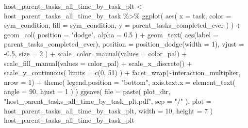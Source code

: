 \documentclass[
]{book}
\newenvironment{Shaded}{\begin{snugshade}}{\end{snugshade}}
\newcommand{\AttributeTok}[1]{\textcolor[rgb]{0.77,0.63,0.00}{#1}}
\newcommand{\DecValTok}[1]{\textcolor[rgb]{0.00,0.00,0.81}{#1}}
\newcommand{\FloatTok}[1]{\textcolor[rgb]{0.00,0.00,0.81}{#1}}
\newcommand{\FunctionTok}[1]{\textcolor[rgb]{0.00,0.00,0.00}{#1}}
\newcommand{\NormalTok}[1]{#1}
\newcommand{\OtherTok}[1]{\textcolor[rgb]{0.56,0.35,0.01}{#1}}
\newcommand{\SpecialCharTok}[1]{\textcolor[rgb]{0.00,0.00,0.00}{#1}}
\newcommand{\StringTok}[1]{\textcolor[rgb]{0.31,0.60,0.02}{#1}}
\begin{document}
\begin{Shaded}
\begin{Highlighting}[]
\NormalTok{host\_parent\_tasks\_all\_time\_by\_task\_plt }\OtherTok{\textless{}{-}}\NormalTok{ host\_parent\_tasks\_all\_time\_by\_task }\SpecialCharTok{\%\textgreater{}\%}
  \FunctionTok{ggplot}\NormalTok{(}
    \FunctionTok{aes}\NormalTok{(}
      \AttributeTok{x =}\NormalTok{ task,}
      \AttributeTok{color =}\NormalTok{ sym\_condition,}
      \AttributeTok{fill =}\NormalTok{ sym\_condition,}
      \AttributeTok{y =}\NormalTok{ parent\_tasks\_completed\_ever}
\NormalTok{    )}
\NormalTok{  ) }\SpecialCharTok{+}
  \FunctionTok{geom\_col}\NormalTok{(}
    \AttributeTok{position =} \StringTok{"dodge"}\NormalTok{,}
    \AttributeTok{alpha =} \FloatTok{0.5}
\NormalTok{  ) }\SpecialCharTok{+}
  \FunctionTok{geom\_text}\NormalTok{(}
    \FunctionTok{aes}\NormalTok{(}\AttributeTok{label =}\NormalTok{ parent\_tasks\_completed\_ever),}
    \AttributeTok{position =} \FunctionTok{position\_dodge}\NormalTok{(}\AttributeTok{width =} \DecValTok{1}\NormalTok{),}
    \AttributeTok{vjust =} \SpecialCharTok{{-}}\FloatTok{0.5}\NormalTok{,}
    \AttributeTok{size =} \DecValTok{2}
\NormalTok{  ) }\SpecialCharTok{+}
  \FunctionTok{scale\_color\_manual}\NormalTok{(}\AttributeTok{values =}\NormalTok{ color\_pal) }\SpecialCharTok{+}
  \FunctionTok{scale\_fill\_manual}\NormalTok{(}\AttributeTok{values =}\NormalTok{ color\_pal) }\SpecialCharTok{+}
  \FunctionTok{scale\_x\_discrete}\NormalTok{() }\SpecialCharTok{+}
  \FunctionTok{scale\_y\_continuous}\NormalTok{(}
    \AttributeTok{limits =} \FunctionTok{c}\NormalTok{(}\DecValTok{0}\NormalTok{, }\DecValTok{51}\NormalTok{)}
\NormalTok{  ) }\SpecialCharTok{+}
  \FunctionTok{facet\_wrap}\NormalTok{(}\SpecialCharTok{\textasciitilde{}}\NormalTok{interaction\_multiplier, }\AttributeTok{nrow =} \DecValTok{1}\NormalTok{) }\SpecialCharTok{+}
  \FunctionTok{theme}\NormalTok{(}
    \AttributeTok{legend.position =} \StringTok{"bottom"}\NormalTok{,}
    \AttributeTok{axis.text.x =} \FunctionTok{element\_text}\NormalTok{(}
      \AttributeTok{angle =} \DecValTok{90}\NormalTok{,}
      \AttributeTok{hjust =} \DecValTok{1}
\NormalTok{    )}
\NormalTok{  )}
\FunctionTok{ggsave}\NormalTok{(}
  \AttributeTok{file =} \FunctionTok{paste}\NormalTok{(}
\NormalTok{    plot\_dir,}
    \StringTok{"host\_parent\_tasks\_all\_time\_by\_task\_plt.pdf"}\NormalTok{,}
    \AttributeTok{sep =} \StringTok{"/"}
\NormalTok{  ),}
  \AttributeTok{plot =}\NormalTok{ host\_parent\_tasks\_all\_time\_by\_task\_plt,}
  \AttributeTok{width =} \DecValTok{10}\NormalTok{,}
  \AttributeTok{height =} \DecValTok{7}
\NormalTok{)}
\NormalTok{host\_parent\_tasks\_all\_time\_by\_task\_plt}
\end{Highlighting}
\end{Shaded}
\end{document}
